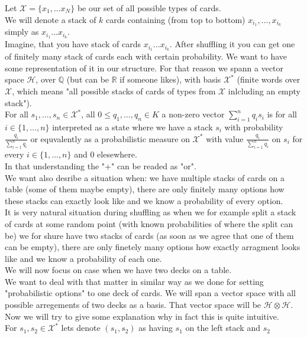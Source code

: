 \documentclass[a4paper, 12pt]{report}
\begin{document}
Let $\mathcal{X} = \{x_1, \dots x_N\}$ be our set of all possible types of cards. \\
We will denote a stack of $k$ cards containing (from top to bottom) $x_{i_1}, \dots, x_{i_k}$ simply as
$x_{i_1}\dots x_{i_k}$. \\
Imagine, that you have stack of cards $x_{i_1}\dots x_{i_k}$. After shuffling it
you can get one of finitely many stack of cards each with certain probability. We want to have some
representation of it in our structure.
For that reason we spann a vector space $\mathcal{H}$, over $\mathbb{Q}$ (but can be $\mathbb{R}$ if someone
likes),
with basis $\mathcal{X}^*$ (finite words over $\mathcal{X}$, which means "all possible stacks
of cards of types from $\mathcal{X}$ inlcluding an empty stack"). \\
For all $s_1, \dots, s_n \in \mathcal{X}^*$, all $0 \leq q_1, \dots, q_n \in K$ a non-zero vector
$\displaystyle\sum^{n}_{i = 1} q_is_i$ is for all $i \in \{1, \dots, n\}$
interpreted as a state where we have a stack $s_i$ with probability $\frac{q_i}{\sum^n_{i=1} q_i}$ or
equvalently as a probabilistic measure on $\mathcal{X}^*$ with value $\frac{q_i}{\sum^n_{i=1} q_i}$ on $s_i$
for every $i \in \{1, \dots, n\}$ and $0$ elesewhere. \\
In that understanding the "+" can be readed as "or". \\
We want also desribe a situation when: we have multiple stacks of cards on a table (some of them maybe
empty), there are only finitely many options how
these stacks can exactly look like and we know a probability of every option.\\
It is very natural situation during shuffling as when we for example split a stack of cards at some
random point (with known probabilities of where the split can be)
we for shure have two stacks of cards (as soon as we agree that one of them can be empty),
there are only finetely many options how exactly arragment looks like and we know a probability of each one.
\\ We will now focus on case when we have two decks on a table. \\
We want to deal with that matter in similar way as we done for setting "probabilistic options" to one deck
of cards. We will span a vector space with all possible arregements of two decks as a basis.
That vector space will be $\mathcal{H} \otimes \mathcal{H}$. Now we will try to give some explanation why in
fact this is quite intuitive.  \\
For $s_1, s_2 \in \mathcal{X}^*$ lets denote $(s_1, s_2)$ as having $s_1$ on the left stack and $s_2$
\end{document}
